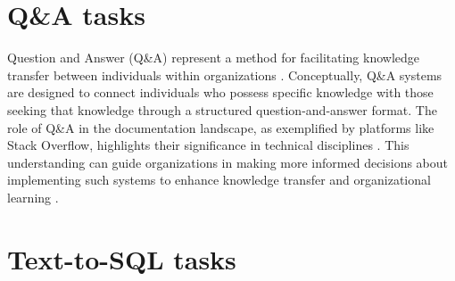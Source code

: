     \section{Q\&A tasks}     

        Question and Answer (Q\&A) represent a method for facilitating knowledge transfer between individuals within organizations \citep{Iske2005}. Conceptually, Q\&A systems are designed to connect individuals who possess specific knowledge with those seeking that knowledge through a structured question-and-answer format. 
        The role of Q\&A in the documentation landscape, as exemplified by platforms like Stack Overflow, highlights their significance in technical disciplines \citep{Treude2011}. This understanding can guide organizations in making more informed decisions about implementing such systems to enhance knowledge transfer and organizational learning \citep{Iske2005}.


    
        
    
    \section{Text-to-SQL tasks} 

